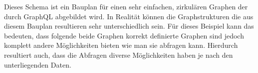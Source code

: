 \begin{center}
\end{center}


Dieses Schema ist ein Bauplan für einen sehr einfachen, zirkulären Graphen der durch GraphQL abgebildet wird.
In Realität können die Graphstrukturen die aus diesem Bauplan resultieren sehr unterschiedlich sein.
Für dieses Beispiel kann das bedeuten, dass folgende beide Graphen korrekt definierte Graphen sind jedoch komplett
andere Möglichkeiten bieten wie man sie abfragen kann. Hierdurch resultiert auch, dass die Abfragen
diverse Möglichkeiten haben je nach den unterliegenden Daten.

